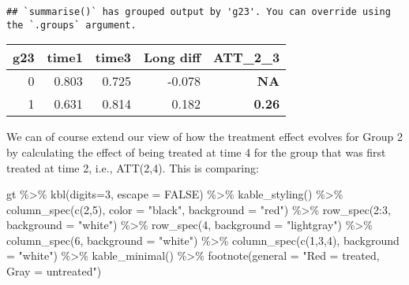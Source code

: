\documentclass[
]{article}
\newenvironment{Shaded}{\begin{snugshade}}{\end{snugshade}}
\newcommand{\AttributeTok}[1]{\textcolor[rgb]{0.77,0.63,0.00}{#1}}
\newcommand{\ConstantTok}[1]{\textcolor[rgb]{0.00,0.00,0.00}{#1}}
\newcommand{\DecValTok}[1]{\textcolor[rgb]{0.00,0.00,0.81}{#1}}
\newcommand{\FunctionTok}[1]{\textcolor[rgb]{0.00,0.00,0.00}{#1}}
\newcommand{\NormalTok}[1]{#1}
\newcommand{\SpecialCharTok}[1]{\textcolor[rgb]{0.00,0.00,0.00}{#1}}
\newcommand{\StringTok}[1]{\textcolor[rgb]{0.31,0.60,0.02}{#1}}
\begin{document}
\begin{verbatim}
## `summarise()` has grouped output by 'g23'. You can override using the `.groups` argument.
\end{verbatim}

\begin{table}
\centering
\begin{tabular}{r|r|r|r|>{}r}
\hline
g23 & time1 & time3 & Long diff & ATT\_2\_3\\
\hline
0 & 0.803 & 0.725 & -0.078 & \textbf{NA}\\
\hline
1 & 0.631 & 0.814 & 0.182 & \textbf{0.26}\\
\hline
\end{tabular}
\end{table}

We can of course extend our view of how the treatment effect evolves for
Group 2 by calculating the effect of being treated at time 4 for the
group that was first treated at time 2, i.e., ATT(2,4). This is
comparing:

\begin{Shaded}
\begin{Highlighting}[]
\NormalTok{gt }\SpecialCharTok{\%\textgreater{}\%}
  \FunctionTok{kbl}\NormalTok{(}\AttributeTok{digits=}\DecValTok{3}\NormalTok{, }\AttributeTok{escape =} \ConstantTok{FALSE}\NormalTok{) }\SpecialCharTok{\%\textgreater{}\%}
  \FunctionTok{kable\_styling}\NormalTok{() }\SpecialCharTok{\%\textgreater{}\%}
  \FunctionTok{column\_spec}\NormalTok{(}\FunctionTok{c}\NormalTok{(}\DecValTok{2}\NormalTok{,}\DecValTok{5}\NormalTok{), }\AttributeTok{color =} \StringTok{"black"}\NormalTok{, }\AttributeTok{background =} \StringTok{"red"}\NormalTok{) }\SpecialCharTok{\%\textgreater{}\%}
  \FunctionTok{row\_spec}\NormalTok{(}\DecValTok{2}\SpecialCharTok{:}\DecValTok{3}\NormalTok{, }\AttributeTok{background =} \StringTok{"white"}\NormalTok{) }\SpecialCharTok{\%\textgreater{}\%}
  \FunctionTok{row\_spec}\NormalTok{(}\DecValTok{4}\NormalTok{, }\AttributeTok{background  =} \StringTok{"lightgray"}\NormalTok{) }\SpecialCharTok{\%\textgreater{}\%}
  \FunctionTok{column\_spec}\NormalTok{(}\DecValTok{6}\NormalTok{, }\AttributeTok{background =} \StringTok{"white"}\NormalTok{) }\SpecialCharTok{\%\textgreater{}\%}
  \FunctionTok{column\_spec}\NormalTok{(}\FunctionTok{c}\NormalTok{(}\DecValTok{1}\NormalTok{,}\DecValTok{3}\NormalTok{,}\DecValTok{4}\NormalTok{), }\AttributeTok{background =} \StringTok{"white"}\NormalTok{) }\SpecialCharTok{\%\textgreater{}\%}
  \FunctionTok{kable\_minimal}\NormalTok{() }\SpecialCharTok{\%\textgreater{}\%}
  \FunctionTok{footnote}\NormalTok{(}\AttributeTok{general =} \StringTok{"Red = treated, Gray = untreated"}\NormalTok{)}
\end{Highlighting}
\end{Shaded}
\end{document}
